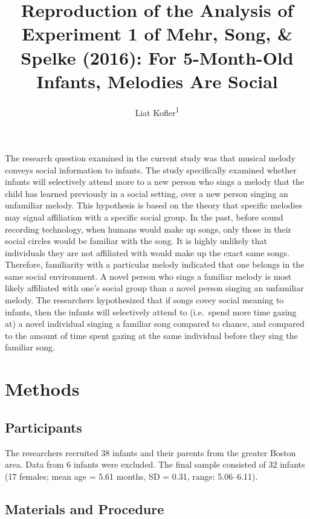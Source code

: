 \documentclass[
  english,
  man]{apa6}
\title{Reproduction of the Analysis of Experiment 1 of Mehr, Song, \& Spelke (2016): For 5-Month-Old Infants, Melodies Are Social}
\author{Liat Kofler\textsuperscript{1}}
\date{}
\affiliation{\vspace{0.5cm}\textsuperscript{1} Brooklyn College of the City University of New York}
\begin{document}
\maketitle

The research question examined in the current study was that musical melody conveys social information to infants. The study specifically examined whether infants will selectively attend more to a new person who sings a melody that the child has learned previously in a social setting, over a new person singing an unfamiliar melody. This hypothesis is based on the theory that specific melodies may signal affiliation with a specific social group. In the past, before sound recording technology, when humans would make up songs, only those in their social circles would be familiar with the song. It is highly unlikely that individuals they are not affiliated with would make up the exact same songs. Therefore, familiarity with a particular melody indicated that one belongs in the same social environment. A novel person who sings a familiar melody is most likely affiliated with one's social group than a novel person singing an unfamiliar melody. The researchers hypothesized that if songs covey social meaning to infants, then the infants will selectively attend to (i.e.~spend more time gazing at) a novel individual singing a familiar song compared to chance, and compared to the amount of time spent gazing at the same individual before they sing the familiar song.

\hypertarget{methods}{%
\section{Methods}\label{methods}}

\hypertarget{participants}{%
\subsection{Participants}\label{participants}}

The researchers recruited 38 infants and their parents from the greater Boston area. Data from 6 infants were excluded. The final sample consisted of 32 infants (17 females; mean age = 5.61 months, SD = 0.31, range: 5.06--6.11).

\hypertarget{materials-and-procedure}{%
\subsection{Materials and Procedure}\label{materials-and-procedure}}
\end{document}

